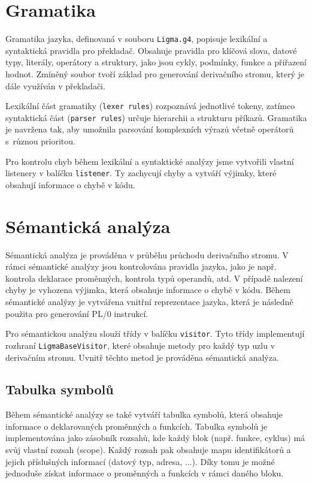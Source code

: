 \documentclass[czech, oth, kiv, he, iso690numb, viewonly]{fasthesis}
\begin{document}
    \pagebreak

    \section{Gramatika}

    Gramatika jazyka, definovaná v souboru \texttt{Ligma.g4}, popisuje lexikální a syntaktická pravidla pro překladač.
    Obsahuje pravidla pro klíčová slova, datové typy, literály, operátory a struktury, jako jsou cykly, podmínky, funkce a přiřazení hodnot.
    Zmíněný soubor tvoří základ pro generování derivačního stromu, který je dále využíván v překladači.
    
    Lexikální část gramatiky (\texttt{lexer rules}) rozpoznává jednotlivé tokeny, zatímco syntaktická část (\texttt{parser rules}) určuje hierarchii a strukturu příkazů. 
    Gramatika je navržena tak, aby umožnila parsování komplexních výrazů včetně operátorů s~různou prioritou. 

    Pro kontrolu chyb během lexikální a syntaktické analýzy jsme vytvořili vlastní listenery v balíčku \texttt{listener}.
    Ty zachycují chyby a vytváří výjimky, které obsahují informace o chybě v kódu.

    \section{Sémantická analýza}

    Sémantická analýza je prováděna v průběhu průchodu derivačního stromu.
    V rámci sémantické analýzy jsou kontrolována pravidla jazyka, jako je např. kontrola deklarace proměnných, kontrola typů operandů, atd.
    V případě nalezení chyby je vyhozena výjimka, která obsahuje informace o chybě v kódu.
    Během sémantické analýzy je vytvářena vnitřní reprezentace jazyka, která je následně použita pro generování PL/0 instrukcí.

    Pro sémantickou analýzu slouží třídy v balíčku \texttt{visitor}.
    Tyto třídy implementují rozhraní \texttt{LigmaBaseVisitor}, které obsahuje metody pro každý typ uzlu v derivačním stromu.
    Uvnitř těchto metod je prováděna sémantická analýza.

    \subsection{Tabulka symbolů}

    Během sémantické analýzy se také vytváří tabulka symbolů, která obsahuje informace o deklarovaných proměnných a funkcích.
    Tabulka symbolů je implementována jako zásobník rozsahů, kde každý blok (např. funkce, cyklus) má svůj vlastní rozsah (scope).
    Každý rozsah pak obsahuje mapu identifikátorů a jejich příslušných informací (datový typ, adresa, ...).
    Díky tomu je možné jednoduše získat informace o proměnných a funkcích v rámci daného bloku.
\end{document}
